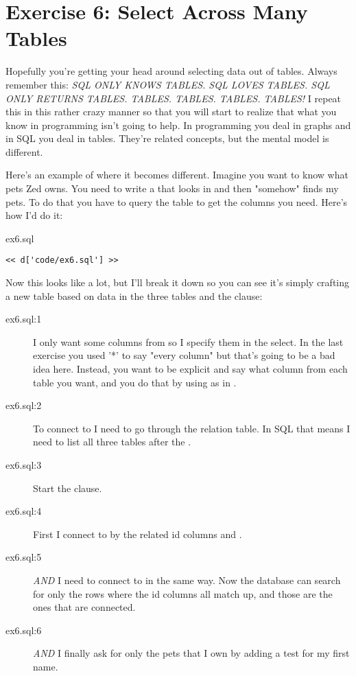 \chapter{Exercise 6: Select Across Many Tables}

Hopefully you're getting your head around selecting data out of tables.  Always
remember this: \emph{SQL ONLY KNOWS TABLES. SQL LOVES TABLES. SQL ONLY RETURNS
    TABLES. TABLES. TABLES. TABLES. TABLES!}  I repeat this in this rather
crazy manner so that you will start to realize that what you know in programming
isn't going to help.  In programming you deal in graphs and in SQL you deal in
tables.  They're related concepts, but the mental model is different.

Here's an example of where it becomes different.  Imagine you want to 
know what pets Zed owns.  You need to write a  that 
looks in  and then "somehow" finds my pets.  To do that
you have to query the  table to get the 
columns you need.  Here's how I'd do it:

\begin{code}{ex6.sql}
\begin{Verbatim}
<< d['code/ex6.sql'] >>
\end{Verbatim}
\end{code}

Now this looks like a lot, but I'll break it down so you can see it's
simply crafting a new table based on data in the three tables and the
 clause:

\begin{description}
\item[ex6.sql:1] I only want some columns from  so I specify them
    in the select.  In the last exercise you used '*' to say "every column"
    but that's going to be a bad idea here.  Instead, you want to be explicit
    and say what column from each table you want, and you do that by using
     as in .
\item[ex6.sql:2] To connect  to  I need to go
    through the  relation table.  In SQL that means I
    need to list all three tables after the .
\item[ex6.sql:3] Start the  clause.
\item[ex6.sql:4] First I connect  to  by the
    related id columns  and .
\item[ex6.sql:5] \emph{AND} I need to connect  to 
    in the same way. Now the database can search for only the rows where the id
    columns all match up, and those are the ones that are connected.
\item[ex6.sql:6] \emph{AND} I finally ask for only the pets that I own by adding a
     test for my first name.
\end{description}

